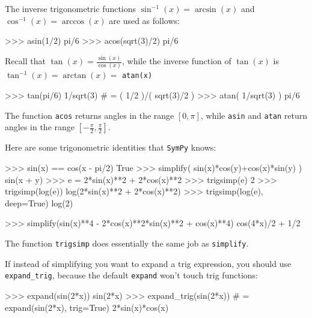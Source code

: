 \noindent
The inverse trigonometric functions $\sin^{-1}(x) = \arcsin(x)$
and $\cos^{-1}(x) = \arccos(x)$ are used as follows:

\small
\begin{verbatimtab}
>>> asin(1/2)
pi/6
>>> acos(sqrt(3)/2)
pi/6
\end{verbatimtab}
\normalsize
Recall that $\tan(x) = \frac{\sin(x)}{\cos(x)}$,
while the inverse function of $\tan(x)$ is $\tan^{-1}(x) = \arctan(x) =$ \texttt{atan(x)}



\small
\begin{verbatimtab}
>>> tan(pi/6)
1/sqrt(3)                          # = ( 1/2 )/( sqrt(3)/2 )
>>> atan( 1/sqrt(3) )
pi/6
\end{verbatimtab}
\normalsize

\noindent
The function \texttt{acos} returns angles in the range $[0,\pi]$,
while \texttt{asin} and \texttt{atan} return angles in the range $[-\frac{\pi}{2},\frac{\pi}{2}]$.


Here are some trigonometric identities that \texttt{SymPy} knows:												

\small
\begin{verbatimtab}
>>> sin(x) == cos(x - pi/2)      
True
>>> simplify( sin(x)*cos(y)+cos(x)*sin(y) )
sin(x + y)
>>> e = 2*sin(x)**2 + 2*cos(x)**2
>>> trigsimp(e)
2
>>> trigsimp(log(e))
log(2*sin(x)**2 + 2*cos(x)**2)
>>> trigsimp(log(e), deep=True)
log(2)
\end{verbatimtab}
\normalsize

\small
\begin{verbatimtab}
>>> simplify(sin(x)**4 - 2*cos(x)**2*sin(x)**2 + cos(x)**4)
cos(4*x)/2 + 1/2
\end{verbatimtab}
\normalsize

\noindent
The function \texttt{trigsimp} does essentially the same job as \texttt{simplify}.

If instead of simplifying you want to expand a trig expression,
you should use \texttt{expand\_trig}, because the default \texttt{expand} won't touch trig functions:

\small
\begin{verbatimtab}
>>> expand(sin(2*x))
sin(2*x)
>>> expand_trig(sin(2*x))   # = expand(sin(2*x), trig=True)
2*sin(x)*cos(x)
\end{verbatimtab}
\normalsize



